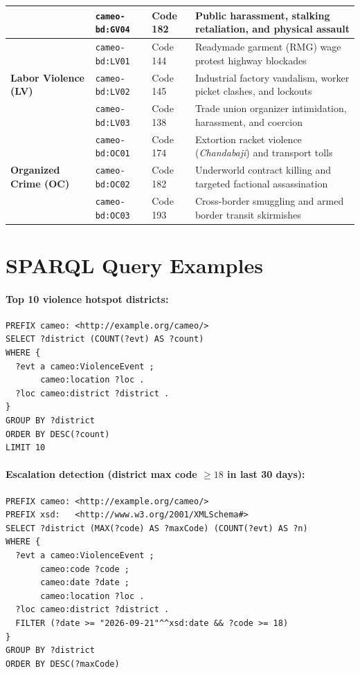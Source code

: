\documentclass[11pt,a4paper]{article}
\begin{document}
\begin{table}[h]
\begin{tabular}{lllp{7.5cm}}
& \texttt{cameo-bd:GV04} & Code 182 & Public harassment, stalking retaliation, and physical assault \\
\midrule
\multirow{3}{*}{\textbf{Labor Violence (LV)}} 
& \texttt{cameo-bd:LV01} & Code 144 & Readymade garment (RMG) wage protest highway blockades \\
& \texttt{cameo-bd:LV02} & Code 145 & Industrial factory vandalism, worker picket clashes, and lockouts \\
& \texttt{cameo-bd:LV03} & Code 138 & Trade union organizer intimidation, harassment, and coercion \\
\midrule
\multirow{3}{*}{\textbf{Organized Crime (OC)}} 
& \texttt{cameo-bd:OC01} & Code 174 & Extortion racket violence (\textit{Chandabaji}) and transport tolls \\
& \texttt{cameo-bd:OC02} & Code 182 & Underworld contract killing and targeted factional assassination \\
& \texttt{cameo-bd:OC03} & Code 193 & Cross-border smuggling and armed border transit skirmishes \\
\bottomrule
\end{tabular}
\end{table}

\section{SPARQL Query Examples}
\label{app:sparql}

\paragraph{Top 10 violence hotspot districts:}
\begin{verbatim}
PREFIX cameo: <http://example.org/cameo/>
SELECT ?district (COUNT(?evt) AS ?count)
WHERE {
  ?evt a cameo:ViolenceEvent ;
       cameo:location ?loc .
  ?loc cameo:district ?district .
}
GROUP BY ?district
ORDER BY DESC(?count)
LIMIT 10
\end{verbatim}

\paragraph{Escalation detection (district max code $\geq 18$ in last 30 days):}
\begin{verbatim}
PREFIX cameo: <http://example.org/cameo/>
PREFIX xsd:   <http://www.w3.org/2001/XMLSchema#>
SELECT ?district (MAX(?code) AS ?maxCode) (COUNT(?evt) AS ?n)
WHERE {
  ?evt a cameo:ViolenceEvent ;
       cameo:code ?code ;
       cameo:date ?date ;
       cameo:location ?loc .
  ?loc cameo:district ?district .
  FILTER (?date >= "2026-09-21"^^xsd:date && ?code >= 18)
}
GROUP BY ?district
ORDER BY DESC(?maxCode)
\end{verbatim}
\end{document}
